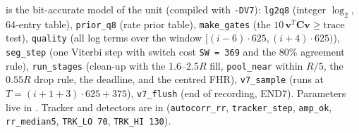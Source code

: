 \documentclass[11pt]{article}
\begin{document}
 is the bit-accurate model of the  unit (compiled with \texttt{-DV7}): \texttt{lg2q8} (integer $\log_2$, 64-entry table), \texttt{prior\_q8} (rate prior table), \texttt{make\_gates} (the $10\,\mathbf{v}^T\mathbf{C}\mathbf{v} \ge \text{trace}$ test), \texttt{quality} (all log terms over the window $[(i-6)\cdot625, (i+4)\cdot625)$), \texttt{seg\_step} (one Viterbi step with switch cost \texttt{SW = 369} and the 80\% agreement rule), \texttt{run\_stages} (clean-up with the 1.6--2.5$R$ fill, \texttt{pool\_near} within $R/5$, the $0.55R$ drop rule, the deadline, and the centred FHR), \texttt{v7\_sample} (runs at $T = (i+1+3)\cdot625 + 375$), \texttt{v7\_flush} (end of recording, END7). Parameters live in . Tracker and detectors are in  (\texttt{autocorr\_rr}, \texttt{tracker\_step}, \texttt{amp\_ok}, \texttt{rr\_median5}, \texttt{TRK\_LO 70}, \texttt{TRK\_HI 130}).
\end{document}
